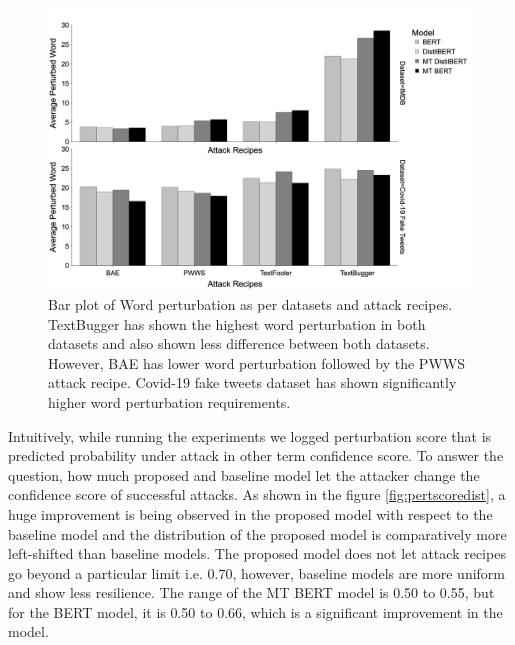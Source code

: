 \documentclass[%
	BCOR=8mm, %
	DIV=12,
	toc=bibliography, %
	toc=listof, %
	oneside, %
	egregdoesnotlikesansseriftitles, %
	]{scrbook}
\begin{document}
\begin{figure}[H]
    \centering
    \includegraphics[width=0.78\linewidth]{img/AvgPertByDataset}
    \caption[Bar plot of Word perturbation]{Bar plot of Word perturbation as per datasets and attack recipes. TextBugger has shown the highest word perturbation in both datasets and also shown less difference between both datasets. However, BAE has lower word perturbation followed by the PWWS attack recipe. Covid-19 fake tweets dataset has shown significantly higher word perturbation requirements.  }
    \label{fig:avgpertbyattackrecipes}
\end{figure}
Intuitively, while running the experiments we logged perturbation score that is predicted probability under attack in other term confidence score. To answer the question, how much proposed and baseline model let the attacker change the confidence score of successful attacks. As shown in the figure \ref{fig:pertscoredist}, a huge improvement is being observed in the proposed model  with respect to the baseline model and the distribution of the proposed model is comparatively more left-shifted than baseline models. The proposed model does not let attack recipes go beyond a particular limit i.e. 0.70, however, baseline models are more uniform and show less resilience.  The range of the MT BERT model is 0.50 to 0.55, but for the BERT model, it is 0.50 to 0.66, which is a significant improvement in the model.
\end{document}
